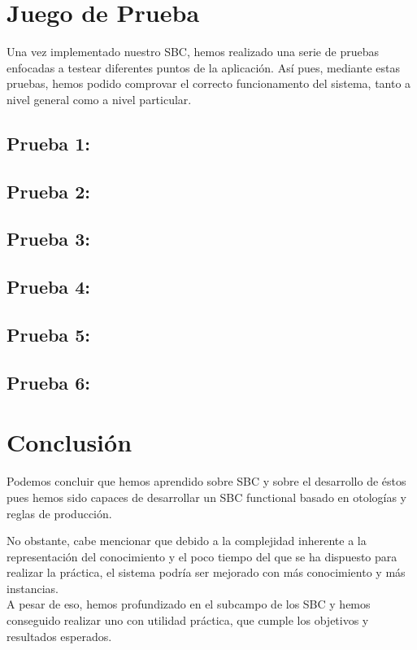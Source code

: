 \documentclass[12]{article}
\begin{document}
\section{Juego de Prueba}
Una vez implementado nuestro SBC, hemos realizado una serie de pruebas enfocadas a testear diferentes puntos de la aplicación. Así pues, mediante estas pruebas, hemos podido comprovar el correcto funcionamento del sistema, tanto a nivel general como a nivel particular.

\subsection{Prueba 1: }
\subsection{Prueba 2: }
\subsection{Prueba 3: }
\subsection{Prueba 4: }
\subsection{Prueba 5: }
\subsection{Prueba 6: }
\section{Conclusión}
Podemos concluir que hemos aprendido sobre SBC y sobre el desarrollo de éstos pues hemos sido capaces de desarrollar un SBC functional basado en otologías y reglas de producción.
\medksip

No obstante, cabe mencionar que debido a la complejidad inherente a la representación del conocimiento y el poco tiempo del que se ha dispuesto para realizar la práctica, el sistema podría ser mejorado con más conocimiento y más instancias. 
\\

A pesar de eso, hemos profundizado en el subcampo de los SBC y hemos conseguido realizar uno con utilidad práctica, que cumple los objetivos y resultados esperados.
\end{document}
